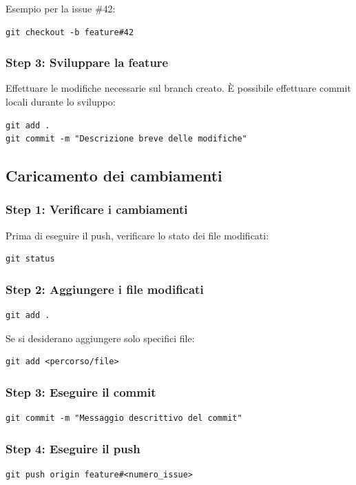 Esempio per la issue \#42:
\begin{verbatim}
git checkout -b feature#42
\end{verbatim}

\subsubsection{Step 3: Sviluppare la feature}
Effettuare le modifiche necessarie sul branch creato. È possibile effettuare commit locali durante lo sviluppo:

\begin{verbatim}
git add .
git commit -m "Descrizione breve delle modifiche"
\end{verbatim}

\subsection{Caricamento dei cambiamenti}

\subsubsection{Step 1: Verificare i cambiamenti}
Prima di eseguire il push, verificare lo stato dei file modificati:

\begin{verbatim}
git status
\end{verbatim}

\subsubsection{Step 2: Aggiungere i file modificati}
\begin{verbatim}
git add .
\end{verbatim}

Se si desiderano aggiungere solo specifici file:
\begin{verbatim}
git add <percorso/file>
\end{verbatim}

\subsubsection{Step 3: Eseguire il commit}
\begin{verbatim}
git commit -m "Messaggio descrittivo del commit"
\end{verbatim}

\subsubsection{Step 4: Eseguire il push}
\begin{verbatim}
git push origin feature#<numero_issue>
\end{verbatim}

